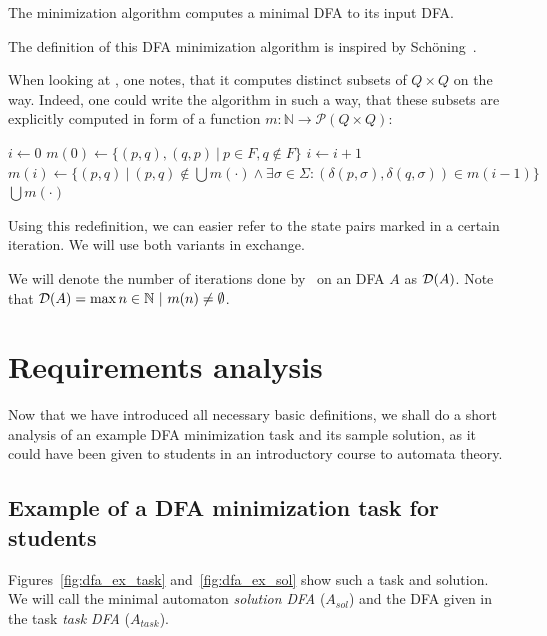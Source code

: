 \begin{theorem}
	The minimization algorithm computes a minimal DFA to its input DFA.
\end{theorem}
\noindent The definition of this DFA minimization algorithm is inspired by Schöning~\cite[p. 46]{schoening01}.

When looking at \MinMark, one notes, that it computes distinct subsets of $Q \times Q$ on the way. Indeed, one could write the algorithm in such a way, that these subsets are explicitly computed in form of a function $m\colon\mathbb{N}\to\mathcal{P}(Q\times Q)$:
\vspace{0.2cm}
\begin{algorithmic}[1]
	\State $i \gets 0$
	\State $m(0) \gets \{ (p,q), (q,p)\ |\ p \in F, q \notin F \}$
	\Do
		\State $i \gets i + 1$
		\State $m(i) \gets \{ (p,q)\ |\ (p,q) \notin \bigcup{m(\cdot)} \land \exists \sigma \in \Sigma \colon (\delta(p,\sigma), \delta(q,\sigma)) \in m(i-1) \}$
	\State \Return $\bigcup{m(\cdot)}$
	\EndFunction
\end{algorithmic}
\vspace{0.2cm}
Using this redefinition, we can easier refer to the state pairs marked in a certain iteration. We will use both variants in exchange.

We will denote the number of iterations done by \MinMark\ on an DFA $A$ as $\mathcal{D}(A)$. Note that $\mathcal{D}(A) = \max n \in \mathbb{N}\ |\ m(n) \neq \emptyset$. 


\section{Requirements analysis}

Now that we have introduced all necessary basic definitions, we shall do a short analysis of an example DFA minimization task and its sample solution, as it could have been given to students in an introductory course to automata theory.

\subsection{Example of a DFA minimization task for students}

Figures~\ref{fig:dfa_ex_task} and~\ref{fig:dfa_ex_sol} show such a task and solution. We will call the minimal automaton \emph{solution DFA} ($A_{sol}$) and the DFA given in the task \emph{task DFA} ($A_{task}$).

